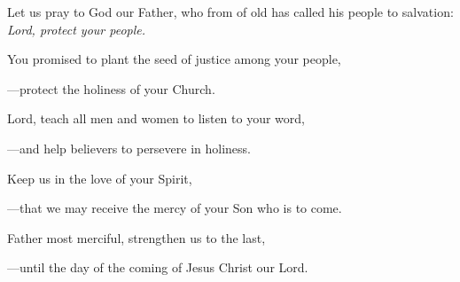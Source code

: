 \intercessions\indent

\begin{hangpar}

Let us pray to God our Father, who from of old has called his people to salvation:\\
\emph{Lord, protect your people.}

\medskip You promised to plant the seed of justice among your people,

{\color{red}---\thinspace}protect the holiness of your Church.

\medskip Lord, teach all men and women to listen to your word,

{\color{red}---\thinspace}and help believers to persevere in holiness.

\medskip Keep us in the love of your Spirit,

{\color{red}---\thinspace}that we may receive the mercy of your Son who is to come.

\medskip Father most merciful, strengthen us to the last,

{\color{red}---\thinspace}until the day of the coming of Jesus Christ our Lord.

\end{hangpar}